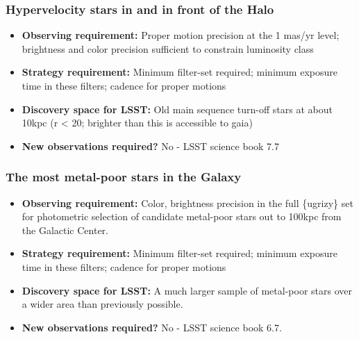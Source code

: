 \subsubsection{Hypervelocity stars in and in front of the Halo}

\begin{itemize}
\item {\bf Observing requirement:} Proper motion precision at the 1 mas/yr level; brightness and color precision sufficient to constrain luminosity class
\vspace{-2mm}

\item {\bf Strategy requirement:} Minimum filter-set required; minimum exposure time in these filters; cadence for proper motions
\vspace{-2mm}

\item {\bf Discovery space for LSST:} Old main sequence turn-off stars at about 10kpc (r < 20; brighter than this is accessible to gaia)
\vspace{-2mm}

\item {\bf New observations required?} No - LSST science book 7.7
\vspace{-2mm}
\end{itemize}

\subsubsection{The most metal-poor stars in the Galaxy}

\begin{itemize}
\item {\bf Observing requirement:} Color, brightness precision in the full \{ugrizy\} set for photometric selection of candidate metal-poor stars out to 100kpc from the Galactic Center.
\vspace{-2mm}

\item {\bf Strategy requirement:} Minimum filter-set required; minimum exposure time in these filters; cadence for proper motions
\vspace{-2mm}

\item {\bf Discovery space for LSST:} A much larger sample of metal-poor stars over a wider area than previously possible. 
\vspace{-2mm}

\item {\bf New observations required?} No - LSST science book 6.7.
\vspace{-2mm}
\end{itemize}


